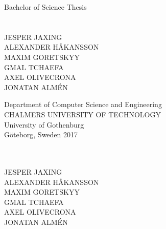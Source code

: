\newpage
\restoregeometry
{}	
\thispagestyle{empty}
\mbox{}

\newpage
\setcounter{page}{1}
\thispagestyle{empty}
\begin{center}
	\large Bachelor of Science Thesis\\[4cm]		%
	\textbf{\large \varthetitle} \\[0.7cm]
	{\large \varthesubtitle}\\[1cm]
	{\large JESPER JAXING}\\
	{\large ALEXANDER HÅKANSSON} \\
	{\large MAXIM GORETSKYY} \\
	{\large GMAL TCHAEFA } \\
	{\large AXEL OLIVECRONA} \\
	{\large JONATAN ALMÉN} \
	
	\vfill	
	\begin{figure}[H]
	\centering
	\end{figure}	\vspace{5mm}	
	
	Department of Computer Science and Engineering \\
	CHALMERS UNIVERSITY OF TECHNOLOGY \\
	University of Gothenburg \\[0.5cm]
	Göteborg, Sweden 2017 \\
\end{center}


\newpage
\thispagestyle{plain}
\textbf{\varthetitle}\\
\varthesubtitle
\vspace*{0.5cm}\\
JESPER JAXING\\
ALEXANDER HÅKANSSON\\
MAXIM GORETSKYY\\
GMAL TCHAEFA\\
AXEL OLIVECRONA\\
JONATAN ALMÉN\setlength{\parskip}{0.7cm}

